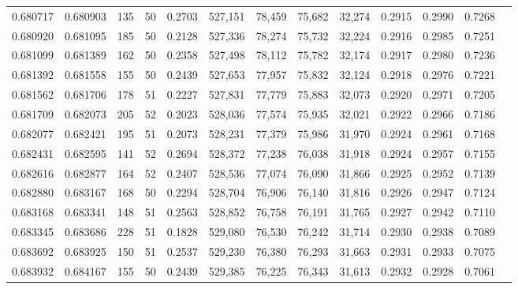 \begin{tabular}{rrrrrrrrrrrrr}
0.680717 & 0.680903 &   135 &  50 &                                     0.2703 & 527,151 &  78,459 &  75,682 &  32,274 & 0.2915 & 0.2990 & 0.7268 \\
0.680920 & 0.681095 &   185 &  50 &                                     0.2128 & 527,336 &  78,274 &  75,732 &  32,224 & 0.2916 & 0.2985 & 0.7251 \\
0.681099 & 0.681389 &   162 &  50 &                                     0.2358 & 527,498 &  78,112 &  75,782 &  32,174 & 0.2917 & 0.2980 & 0.7236 \\
0.681392 & 0.681558 &   155 &  50 &                                     0.2439 & 527,653 &  77,957 &  75,832 &  32,124 & 0.2918 & 0.2976 & 0.7221 \\
0.681562 & 0.681706 &   178 &  51 &                                     0.2227 & 527,831 &  77,779 &  75,883 &  32,073 & 0.2920 & 0.2971 & 0.7205 \\
0.681709 & 0.682073 &   205 &  52 &                                     0.2023 & 528,036 &  77,574 &  75,935 &  32,021 & 0.2922 & 0.2966 & 0.7186 \\
0.682077 & 0.682421 &   195 &  51 &                                     0.2073 & 528,231 &  77,379 &  75,986 &  31,970 & 0.2924 & 0.2961 & 0.7168 \\
0.682431 & 0.682595 &   141 &  52 &                                     0.2694 & 528,372 &  77,238 &  76,038 &  31,918 & 0.2924 & 0.2957 & 0.7155 \\
0.682616 & 0.682877 &   164 &  52 &                                     0.2407 & 528,536 &  77,074 &  76,090 &  31,866 & 0.2925 & 0.2952 & 0.7139 \\
0.682880 & 0.683167 &   168 &  50 &                                     0.2294 & 528,704 &  76,906 &  76,140 &  31,816 & 0.2926 & 0.2947 & 0.7124 \\
0.683168 & 0.683341 &   148 &  51 &                                     0.2563 & 528,852 &  76,758 &  76,191 &  31,765 & 0.2927 & 0.2942 & 0.7110 \\
0.683345 & 0.683686 &   228 &  51 &                                     0.1828 & 529,080 &  76,530 &  76,242 &  31,714 & 0.2930 & 0.2938 & 0.7089 \\
0.683692 & 0.683925 &   150 &  51 &                                     0.2537 & 529,230 &  76,380 &  76,293 &  31,663 & 0.2931 & 0.2933 & 0.7075 \\
0.683932 & 0.684167 &   155 &  50 &                                     0.2439 & 529,385 &  76,225 &  76,343 &  31,613 & 0.2932 & 0.2928 & 0.7061 \\

\end{tabular}
